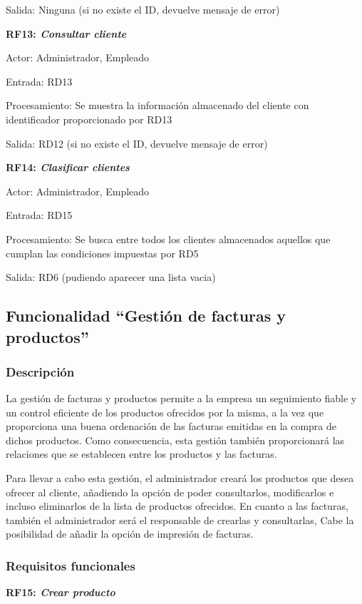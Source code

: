 \documentclass[paper=a4, fontsize=11pt, spanish]{scrartcl}
\begin{document}
Salida: Ninguna (si no existe el ID, devuelve mensaje de error)

\setlength{\parindent}{0em}
\textbf{RF13: \textit{Consultar cliente}}
\setlength{\parindent}{2em}

Actor: Administrador, Empleado

Entrada: RD13

Procesamiento: Se muestra la información almacenado del cliente con identificador proporcionado por RD13

Salida:  RD12 (si no existe el ID, devuelve mensaje de error)

\setlength{\parindent}{0em}
\textbf{RF14: \textit{Clasificar clientes}}
\setlength{\parindent}{2em}

Actor: Administrador, Empleado

Entrada: RD15

Procesamiento:  Se busca entre todos los clientes almacenados aquellos que cumplan las condiciones impuestas por RD5

Salida: RD6 (pudiendo aparecer una lista vacia)

\subsection{Funcionalidad “Gestión de facturas y productos”}
	
\subsubsection{Descripción}
\setlength{\parindent}{3em} La gestión de facturas y productos permite a la empresa un seguimiento fiable y un control eficiente de los productos ofrecidos por la misma, a la vez que proporciona una buena ordenación de las facturas emitidas en la compra de dichos productos. Como consecuencia, esta gestión también proporcionará las relaciones que se establecen entre los productos y las facturas.

	Para llevar a cabo esta gestión, el administrador creará los productos que desea ofrecer al cliente, añadiendo la opción de poder consultarlos, modificarlos e incluso eliminarlos de la lista de productos ofrecidos. En cuanto a las facturas, también el administrador será el responsable de crearlas y consultarlas, Cabe la posibilidad de añadir la opción de impresión de facturas.
	
\subsubsection{Requisitos funcionales}
\setlength{\parindent}{0em}
	\textbf{RF15: \textit{Crear producto}}
	\setlength{\parindent}{2em}
	
\end{document}
